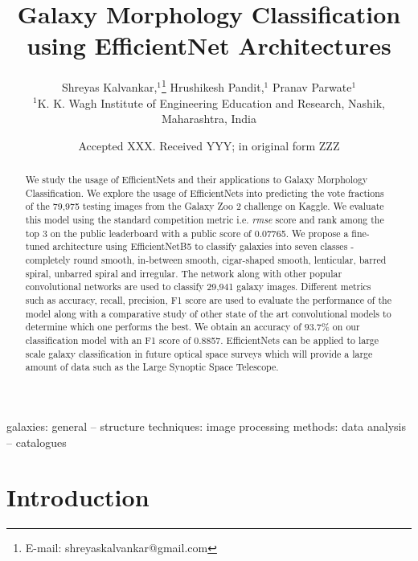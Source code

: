 \documentclass[fleqn,usenatbib]{mnras}
\title[Galaxy Morphologies with EfficientNets]{Galaxy Morphology Classification using EfficientNet Architectures}
\author[S. Kalvankar et al.]{
Shreyas Kalvankar,$^{1}$\thanks{E-mail: shreyaskalvankar@gmail.com}
Hrushikesh Pandit,$^{1}$
Pranav Parwate$^{1}$
\\
$^{1}$K. K. Wagh Institute of Engineering Education and Research, Nashik, Maharashtra, India\\
}
\date{Accepted XXX. Received YYY; in original form ZZZ}
\begin{document}
\label{firstpage}
\pagerange{\pageref{firstpage}--\pageref{lastpage}}
\maketitle

\begin{abstract}
We study the usage of EfficientNets and their applications to Galaxy Morphology Classification. We explore the usage of EfficientNets into predicting the vote fractions of the 79,975 testing images from the Galaxy Zoo 2 challenge on Kaggle. We evaluate this model using the standard competition metric i.e. \textit{rmse} score and rank among the top 3 on the public leaderboard with a public score of 0.07765. We propose a fine-tuned architecture using EfficientNetB5 to classify galaxies into seven classes - completely round smooth, in-between smooth, cigar-shaped smooth, lenticular, barred spiral, unbarred spiral and irregular. The network along with other popular convolutional networks are used to classify 29,941 galaxy images. Different metrics such as accuracy, recall, precision, F1 score are used to evaluate the performance of the model along with a comparative study of other state of the art convolutional models to determine which one performs the best. We obtain an accuracy of 93.7\% on our classification model with an F1 score of 0.8857. EfficientNets can be applied to large scale galaxy classification in future optical space surveys which will provide a large amount of data such as the Large Synoptic Space Telescope.
\end{abstract}

\begin{keywords}
galaxies: general -- structure techniques: image processing methods: data analysis -- catalogues
\end{keywords}



\section{Introduction}
\end{document}
